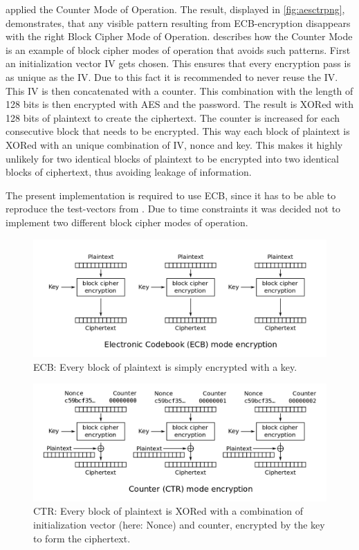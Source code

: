 applied the Counter Mode of Operation. The result, displayed in \ref{fig:aesctrpng}, demonstrates, that any visible pattern resulting from
ECB-encryption disappears with the right Block Cipher Mode of Operation.
\cite[ch. 5.1.5]{paar} describes how the Counter Mode is an example of block
cipher modes of operation that avoids such patterns. First an
initialization vector IV gets chosen. This ensures that every
encryption pass is as unique as the IV. Due to this fact it is
recommended to never reuse the IV. This IV is then concatenated with a counter.
This combination with the length of 128 bits is then encrypted with AES
and the password. The result is XORed with 128 bits of plaintext to
create the ciphertext. The counter is increased for each consecutive
block that needs to be encrypted. This way each block of plaintext is
XORed with an unique combination of IV, nonce and key. This makes it
highly unlikely for two identical blocks of plaintext to be encrypted
into two identical blocks of ciphertext, thus avoiding leakage of
information.

The present implementation is required to use ECB, since it has to be
able to reproduce the test-vectors from \cite[Ap. B, Ap. C.1]{aes2001}. Due to time constraints
it was decided not to implement two different block cipher modes of
operation.

\begin{figure}
\centering
\includegraphics[scale = 0.25]{data/figures/ECB_encryption.png}
\caption{ECB: Every block of plaintext is simply encrypted with a key.}
\end{figure}

\begin{figure}
\centering
\includegraphics[scale = 0.25]{data/figures/CTR_encryption.png}
\caption{CTR: Every block of plaintext is XORed with a combination of initialization vector (here: Nonce) and counter, encrypted by the key to form the ciphertext.}
\end{figure}

